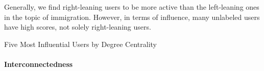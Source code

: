         
        Generally, we find right-leaning users to be more active than the left-leaning ones in the topic of immigration. However, in terms of influence, many unlabeled users have high scores, not solely right-leaning users.


        \begin{table}[!htb]
            \centering
            
            
            
            \caption{Five Most Influential Users by Degree Centrality}
            
            
            \label{tab_net_degree_cent}
        \end{table}



    
    
    
    \paragraph{Interconnectedness}
    
